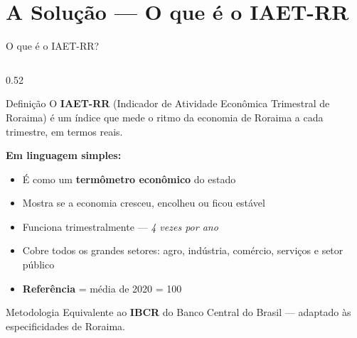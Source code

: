 \documentclass[aspectratio=169, 11pt]{beamer}
\begin{document}
\section{A Solução — O que é o IAET-RR}

\begin{frame}{O que é o IAET-RR?}

  \begin{columns}[T]
    \begin{column}{0.52\textwidth}
      \begin{block}{Definição}
        O \textbf{IAET-RR} (Indicador de Atividade Econômica Trimestral de
        Roraima) é um índice que mede o ritmo da economia de Roraima a cada
        trimestre, em termos reais.
      \end{block}

      \vspace{0.3cm}

      \textbf{Em linguagem simples:}
      \begin{itemize}
        \item É como um \textbf{termômetro econômico} do estado
        \item Mostra se a economia cresceu, encolheu ou ficou estável
        \item Funciona trimestralmente — \textit{4 vezes por ano}
        \item Cobre todos os grandes setores: agro, indústria, comércio,
              serviços e setor público
        \item \textbf{Referência} = média de 2020 = 100
      \end{itemize}

      \vspace{0.3cm}
      \begin{exampleblock}{Metodologia}
        Equivalente ao \textbf{IBCR} do Banco Central do Brasil —
        adaptado às especificidades de Roraima.
      \end{exampleblock}
    \end{column}


\end{columns}
\end{frame}
\end{document}
